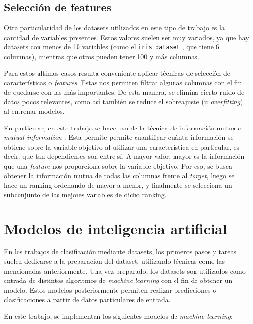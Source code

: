 \subsection{Selección de features}
\label{subsec:seleccion_features}

Otra particularidad de los datasets utilizados en este tipo de trabajo es la cantidad de variables presentes. Estos valores suelen ser muy variados, ya que hay datasets con menos de 10 variables (como el \texttt{iris dataset} \citep{WEBSITE:iris-dataset}, que tiene 6 columnas), mientras que otros pueden tener 100 y más columnas.

Para estos últimos casos resulta conveniente aplicar técnicas de selección de características o \textit{features}. Estas nos permiten filtrar algunas columnas con el fin de quedarse con las más importantes. De esta manera, se elimina cierto ruido de datos pocos relevantes, como así también se reduce el sobreajuste (u \textit{overfitting}) al entrenar modelos.

En particular, en este trabajo se hace uso de la técnica de información mutua o \textit{mutual information} \citep{article:mutualinformation}. Esta permite permite cuantificar cuánta información se obtiene sobre la variable objetivo al utilizar una característica en particular, es decir, que tan dependientes son entre sí. A mayor valor, mayor es la información que una \textit{feature} nos proporciona sobre la variable objetivo. Por eso, se busca obtener la información mutua de todas las columnas frente al \textit{target}, luego se hace un ranking ordenando de mayor a menor, y finalmente se selecciona un subconjunto de las mejores variables de dicho ranking.

\section{Modelos de inteligencia artificial}

En los trabajos de clasificación mediante datasets, los primeros pasos y tareas suelen dedicarse a la preparación del dataset, utilizando técnicas como las mencionadas anteriormente. Una vez preparado, los datasets son utilizados como entrada de distintos algoritmos de \textit{machine learning} con el fin de obtener un modelo. Estos modelos posteriormente permiten realizar predicciones o clasificaciones a partir de datos particulares de entrada.

En este trabajo, se implementan los siguientes modelos de \textit{machine learning}:

